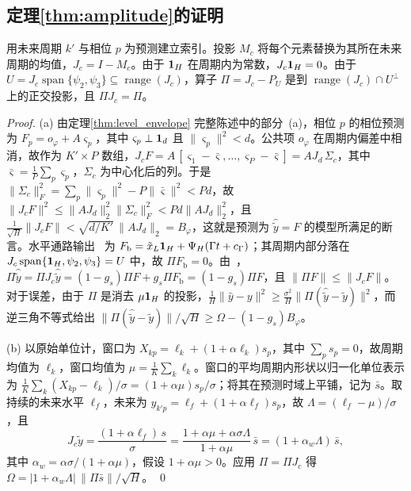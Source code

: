 {\subsection{定理\ref{thm:amplitude}的证明}

用未来周期 $k'$ 与相位 $p$ 为预测建立索引。投影 $M_c$ 将每个元素替换为其所在未来周期的均值，$J_c=I-M_c$。由于 $\mathbf 1_H$ 在周期内为常数，$J_c\mathbf 1_H=0$。由于 $U=J_c\operatorname{span}\{\psi_2,\psi_3\}\subseteq\operatorname{range}(J_c)$，算子 $\Pi=J_c-P_U$ 是到 $\operatorname{range}(J_c)\cap U^\perp$ 上的正交投影，且 $\Pi J_c=\Pi$。

\begin{proof}
(a) 由定理\ref{thm:level_envelope} 完整陈述中的部分~(a)，相位 $p$ 的相位预测为 $F_p=o_\varphi+A\varsigma_p$，其中 $\varsigma_p\perp\mathbf 1_d$ 且 $\|\varsigma_p\|^2<d$。公共项 $o_\varphi$ 在周期内偏差中相消，故作为 $K'\times P$ 数组，$J_cF=A\,[\varsigma_1-\bar\varsigma,\dots,\varsigma_P-\bar\varsigma]=AJ_d\,\Sigma_c$，其中 $\bar\varsigma=\tfrac1P\sum_p\varsigma_p$，$\Sigma_c$ 为中心化后的列。于是 $\|\Sigma_c\|_F^2=\sum_p\|\varsigma_p\|^2-P\|\bar\varsigma\|^2<Pd$，故 $\|J_cF\|^2\le\|AJ_d\|_2^2\|\Sigma_c\|_F^2<Pd\|AJ_d\|_2^2$，且 $\tfrac1{\sqrt H}\|J_cF\|<\sqrt{d/K'}\,\|AJ_d\|_2=B_\varphi$，这就是预测为 $\hat{\tilde y}=F$ 的模型所满足的断言。水平通路输出~ 为 $F_{\mathrm b}=\tilde x_L\mathbf 1_H+\Psi_H(\Gamma t+c_\Gamma)$；其周期内部分落在 $J_c\operatorname{span}\{\mathbf 1_H,\psi_2,\psi_3\}=U$ 中，故 $\Pi F_{\mathrm b}=0$。由~，$\Pi\hat{\tilde y}=\Pi J_c\hat{\tilde y}=(1-g_s)\Pi F+g_s\Pi F_{\mathrm b}=(1-g_s)\Pi F$，且 $\|\Pi F\|\le\|J_cF\|$。对于误差，由于 $\Pi$ 是消去 $\mu\mathbf 1_H$ 的投影，$\tfrac1H\|\hat y-y\|^2\ge\tfrac{\sigma^2}{H}\|\Pi(\hat{\tilde y}-\tilde y)\|^2$，而逆三角不等式给出 $\|\Pi(\hat{\tilde y}-\tilde y)\|/\sqrt H\ge\Omega-(1-g_s)B_\varphi$。

(b) 以原始单位计，窗口为 $X_{kp}=\ell_k+(1+\alpha\ell_k)s_p$，其中 $\sum_ps_p=0$，故周期均值为 $\ell_k$，窗口均值为 $\mu=\tfrac1K\sum_k\ell_k$。窗口的平均周期内形状以归一化单位表示为 $\tfrac1K\sum_k(X_{kp}-\ell_k)/\sigma=(1+\alpha\mu)s_p/\sigma$；将其在预测时域上平铺，记为 $\bar s$。取持续的未来水平 $\ell_f$，未来为 $y_{k'p}=\ell_f+(1+\alpha\ell_f)s_p$，故 $\Lambda=(\ell_f-\mu)/\sigma$，且
\begin{equation*}
	J_c\tilde y=\frac{(1+\alpha\ell_f)\,s}{\sigma}
	=\frac{1+\alpha\mu+\alpha\sigma\Lambda}{1+\alpha\mu}\,\bar s
	=(1+\alpha_w\Lambda)\,\bar s ,
\end{equation*}
其中 $\alpha_w=\alpha\sigma/(1+\alpha\mu)$，假设 $1+\alpha\mu>0$。应用 $\Pi=\Pi J_c$ 得 $\Omega=|1+\alpha_w\Lambda|\,\|\Pi\bar s\|/\sqrt H$。 \qed
\end{proof}



}
